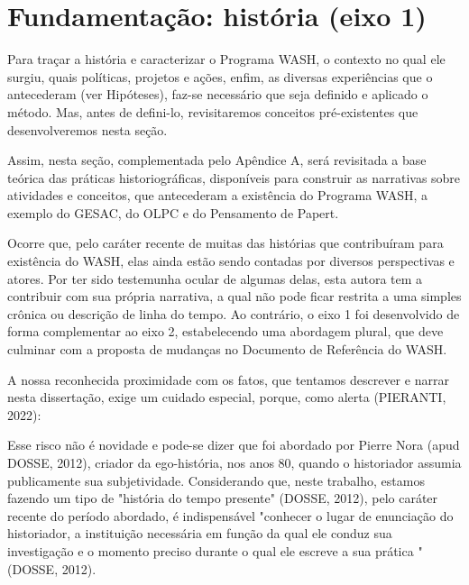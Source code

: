 \section[Fundamentação: história (eixo 1)]{Fundamentação: história (eixo 1)}\label{Fundamentação: história (eixo 1)}
Para traçar a história e caracterizar o Programa WASH, o contexto no qual ele surgiu, quais políticas, projetos e ações, enfim, as diversas experiências que o antecederam (ver Hipóteses), faz-se  necessário que seja definido e aplicado o método. Mas, antes de defini-lo, revisitaremos conceitos pré-existentes que  desenvolveremos nesta seção.

Assim, nesta seção, complementada pelo Apêndice A, será revisitada a base teórica das práticas historiográficas, disponíveis para construir as narrativas sobre atividades e conceitos, que antecederam a existência do Programa WASH, a exemplo do GESAC, do OLPC e do Pensamento de Papert.



Ocorre que, pelo caráter recente de muitas das histórias que contribuíram para existência do WASH, elas ainda estão sendo contadas por diversos perspectivas e atores. Por ter sido testemunha ocular de algumas delas, esta autora tem a contribuir com sua própria narrativa, a qual não pode ficar restrita a uma simples crônica ou descrição de linha do tempo. Ao contrário, o eixo 1 foi desenvolvido de forma complementar ao eixo 2, estabelecendo uma abordagem plural, que deve culminar com a proposta de mudanças no Documento de Referência do WASH.

A nossa reconhecida proximidade com os fatos, que tentamos descrever e narrar nesta dissertação, exige um cuidado especial, porque, como alerta  (PIERANTI, 2022):


\noindent\begin{flushright}\mbox{\linespread{1}\selectfont\centering{}}\end{flushright}


Esse risco não é novidade e pode-se dizer que foi abordado por Pierre Nora  (apud DOSSE, 2012), criador da ego-história, nos anos 80, quando o historiador assumia publicamente sua subjetividade. Considerando que, neste trabalho, estamos fazendo um tipo de "história do tempo presente"  (DOSSE, 2012), pelo caráter recente do período abordado, é indispensável "conhecer o lugar de enunciação do historiador, a instituição necessária em função da qual ele conduz sua investigação e o momento preciso durante o qual ele escreve a sua prática "  (DOSSE, 2012).

